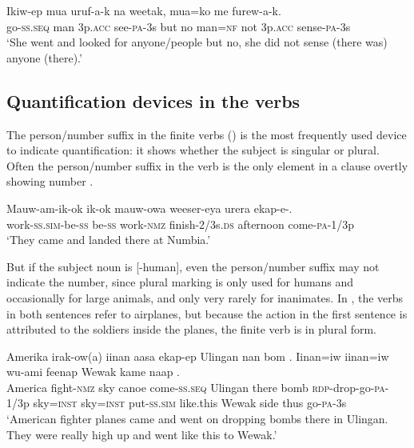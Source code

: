 \ea%
\label{ex:6:x1309}
\gll Ikiw-ep  mua    uruf-a-k  na  weetak,  mua=ko  me   furew-a-k. \\
go-\textsc{ss}.\textsc{seq}  man  3p.\textsc{acc}  see-\textsc{pa}-3s  but  no  man=\textsc{nf}  not 3p.\textsc{acc}  sense-\textsc{pa}-3s\\
\glt `She went and looked for anyone/people but no, she did not sense (there was) anyone (there).'
\z

\subsection{Quantification devices in the verbs} \label{sec:6.4.2}

The person/number suffix in the finite verbs () is the most frequently used device to indicate quantification: it shows whether the subject is singular or plural. Often the person/number suffix in the verb is the only element in a clause overtly showing number . 

\ea%
\label{ex:6:x1296}
\gll Mauw-am-ik-ok  ik-ok  mauw-owa  weeser-eya urera  ekap-e-.\\
work-\textsc{ss}.\textsc{sim}-be-\textsc{ss}  be-\textsc{ss}  work-\textsc{nmz}  finish-2/3s.\textsc{ds} afternoon  come-\textsc{pa}-1/3p\\
\glt `They came and landed there at Numbia.'
\z

But if the subject noun is [-human], even the person/number suffix may not indicate the number, since plural marking is only used for humans and occasionally for large animals, and only very rarely for inanimates. In , the verbs in both sentences refer to airplanes, but because the action in the first sentence is attributed to the soldiers inside the planes, the finite verb is in plural form. 

\ea%
\label{ex:6:x1283}
\gll Amerika  irak-ow(a)  iinan  aasa  ekap-ep  Ulingan  nan  bom .  Iinan=iw  iinan=iw  wu-ami  feenap Wewak  kame  naap  .\\
America  fight-\textsc{nmz}  sky  canoe  come-\textsc{ss}.\textsc{seq}  Ulingan  there  bomb \textsc{rdp}-drop-go-\textsc{pa}-1/3p  sky=\textsc{inst}  sky=\textsc{inst}  put-\textsc{ss}.\textsc{sim}  like.this Wewak  side  thus  go-\textsc{pa}-3s\\
\glt `American fighter planes came and went on dropping bombs there in Ulingan. They were really high up and went like this to Wewak.'
\z

